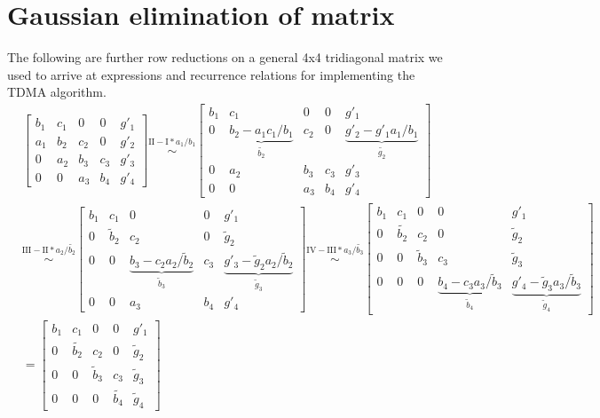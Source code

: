 \documentclass[a4paper, english]{amsart} %
\begin{document}
\section{Gaussian elimination of matrix}
The following are further row reductions on a general 4x4 tridiagonal matrix we used to arrive at expressions and recurrence relations for implementing the TDMA algorithm.
\label{Sec_GEM}
\begin{eqnarray*}
&
\begin{bmatrix}
b_1 & c_1 & 0 & 0 & g'_1 \\
a_1 & b_2 & c_2 & 0 & g'_2 \\
0 & a_2 & b_3 & c_3 & g'_3 \\
0 & 0 & a_3 & b_4 & g'_4
\end{bmatrix} \stackrel{\text{II} - \text{I}*a_1 / b_1}{\sim}
\begin{bmatrix}
b_1 & c_1 & 0 & 0 & g'_1\\
0 & \underbrace{b_2 - a_1 c_1 / b_1}_{\tilde{b_2}} & c_2 & 0 & \underbrace{g'_2 - g'_1 a_1 / b_1}_{\tilde{g_2}} \\
0 & a_2 & b_3 & c_3 & g'_3 \\
0 & 0 & a_3 & b_4 & g'_4
\end{bmatrix} &\\
&
\stackrel{\text{III} - \text{II}*a_2 / \tilde{b_2}}{\sim}
\begin{bmatrix}
b_1 & c_1 & 0 & 0 & g'_1\\
0 & \tilde{b}_2 & c_2 & 0 & \tilde{g}_2 \\ 
0 & 0 & \underbrace{b_3 - c_2 a_2 / \tilde{b}_2}_{\tilde{b}_3} & c_3 & \underbrace{g'_3 - \tilde{g}_2 a_2 / \tilde{b}_2}_{\tilde{g}_3} \\
0 & 0 & a_3 & b_4 & g'_4
\end{bmatrix}
\stackrel{\text{IV} - \text{III}*a_3 / \tilde{b_3}}{\sim}
\begin{bmatrix}
b_1 & c_1 & 0 & 0 & g'_1\\
0 & \tilde{b_2} & c_2 & 0 & \tilde{g}_2 \\ 
0 & 0 & \tilde{b}_3 & c_3 & \tilde{g}_3 \\
0 & 0 & 0 & \underbrace{b_4 - c_3 a_3 / \tilde{b}_3}_{\tilde{b}_4} & \underbrace{g'_4 - \tilde{g}_3 a_3 / \tilde{b}_3}_{\tilde{g}_4}
\end{bmatrix} &\\
&
= 
\begin{bmatrix}
b_1 & c_1 & 0 & 0 & g'_1\\
0 & \tilde{b_2} & c_2 & 0 & \tilde{g}_2 \\ 
0 & 0 & \tilde{b}_3 & c_3 & \tilde{g}_3 \\
0 & 0 & 0 & \tilde{b_4} & \tilde{g}_4
\end{bmatrix}&
\end{eqnarray*}
\end{document}

